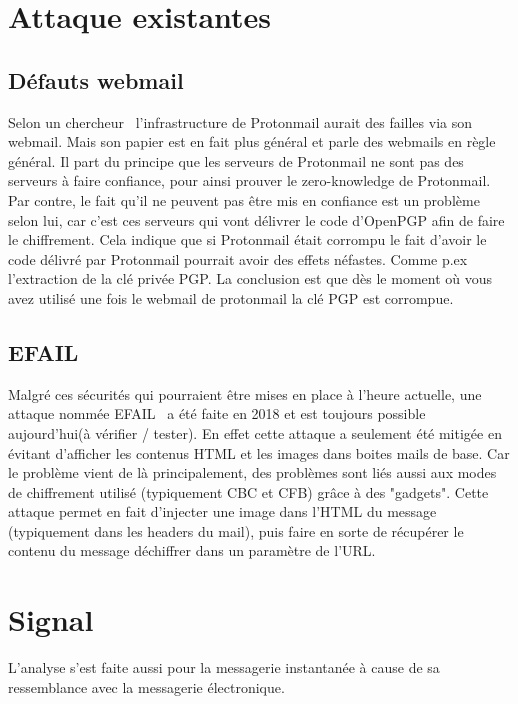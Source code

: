 \section{Attaque existantes}
\subsection{Défauts webmail}
Selon un chercheur~\cite{DBLP:journals/iacr/Kobeissi18a} l'infrastructure de Protonmail aurait des failles via son webmail. Mais son papier est en fait plus général et parle des webmails en règle général.
Il part du principe que les serveurs de Protonmail ne sont pas des serveurs à faire confiance, pour ainsi prouver le zero-knowledge de Protonmail. Par contre, le fait qu'il ne peuvent pas être mis en confiance est un problème selon lui, car c'est ces serveurs qui vont délivrer le code d'OpenPGP afin de faire le chiffrement. 
Cela indique que si Protonmail était corrompu le fait d'avoir le code délivré par Protonmail pourrait avoir des effets néfastes. Comme p.ex l'extraction de la clé privée PGP. La conclusion est que dès le moment où vous avez utilisé une fois le webmail de protonmail la clé PGP est corrompue.
\subsection{EFAIL}
\label{attacks:EFAIL}
Malgré ces sécurités qui pourraient être mises en place à l’heure actuelle, une attaque nommée EFAIL~\cite{DBLP:conf/uss/PoddebniakD0ISF18} a été faite en 2018 et est toujours possible aujourd’hui(à vérifier / tester). En effet cette attaque a seulement été mitigée en évitant d’afficher les contenus HTML et les images dans boites mails de base. Car le problème vient de là principalement, des problèmes sont liés aussi aux modes de chiffrement utilisé (typiquement CBC et CFB) grâce à des "gadgets".
Cette attaque permet en fait d'injecter une image dans l'HTML du message (typiquement dans les headers du mail), puis faire en sorte de récupérer le contenu du message déchiffrer dans un paramètre de l'URL.

\section{Signal}
L'analyse s'est faite aussi pour la messagerie instantanée à cause de sa ressemblance avec la messagerie électronique. 
